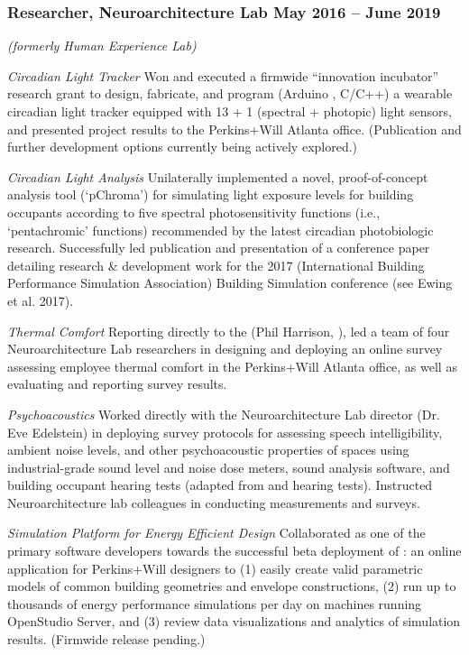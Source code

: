 \documentclass[letterpaper, oneside, 10pt]{article}
\begin{document}
\subsubsection*{Researcher, Neuroarchitecture Lab\DotSep{0.25em} May 2016 -- June 2019}

%
\DotSep{0.25em} \textit{(formerly Human Experience Lab)}%


\textit{Circadian Light Tracker}\DotSep{0.25em}
Won and executed a firmwide ``innovation incubator'' research grant to
design, fabricate, and program (Arduino , C/C++) a
wearable circadian light tracker equipped with 13 + 1 (spectral +
photopic) light sensors, and presented project results to the Perkins+Will
Atlanta office. (Publication and further development options currently
being actively explored.)

\textit{Circadian Light Analysis}\DotSep{0.25em}
Unilaterally implemented a novel, proof-of-concept analysis tool
(`pChroma') for simulating light exposure levels for building occupants
according to five spectral photosensitivity functions (i.e., `pentachromic'
functions) recommended by the latest circadian photobiologic research.
Successfully led publication and presentation of a conference paper
detailing research \& development work for the 2017 
(International Building Performance Simulation Association) Building
Simulation conference (see Ewing et al. 2017).

\textit{Thermal Comfort}\DotSep{0.25em}
Reporting directly to the  (Phil Harrison,
), led a team of four Neuroarchitecture Lab researchers
in designing and deploying an online survey assessing employee thermal
comfort in the Perkins+Will Atlanta office, as well as evaluating and
reporting survey results.

\textit{Psychoacoustics}\DotSep{0.25em}
Worked directly with the Neuroarchitecture Lab director (Dr. Eve
Edelstein) in deploying survey protocols for assessing speech
intelligibility, ambient noise levels, and other psychoacoustic properties
of spaces using industrial-grade sound level and noise dose meters, sound
analysis software, and building occupant hearing tests (adapted from
 and  hearing tests). Instructed
Neuroarchitecture lab colleagues in conducting measurements and surveys.



\textit{%
  Simulation Platform for Energy Efficient Design %
}\DotSep{0.25em}%
Collaborated as one of the primary software developers towards the
successful beta deployment of : an online application
for Perkins+Will designers to (1) easily create valid parametric models of
common building geometries and envelope constructions, (2) run up to
thousands of energy performance simulations per day on 
machines running OpenStudio Server, and (3) review 
data visualizations and analytics of simulation results. (Firmwide release
pending.)
\end{document}
